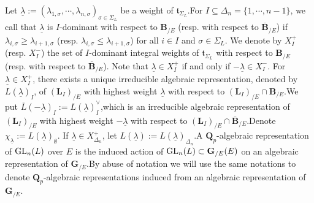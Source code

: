 \documentclass[SecEq,CM,GP]{degruyter-crelle} %
\theoremstyle{plain}
\newcommand{\GL}{{\rm GL}}
\newcommand{\ob}{{\overline{{\mathbf{B}}}}}
\newcommand{\ul}{\underline}
\newcommand{\bB}{{\mathbf{B}}}
\newcommand{\bL}{{\mathbf{L}}}
\newcommand{\bN}{{\mathbf{N}}}
\newcommand{\bQ}{{\mathbf{Q}}}
\newcommand{\ft}{{\mathfrak{t}}}
\begin{document}
Let $\ul{\lambda}:=(\lambda_{1,\sigma}, \cdots, \lambda_{n,\sigma})_{\sigma\in \Sigma_L}$ be a weight of $\ft_{\Sigma_L}$.\;For $I\subseteq \Delta_n=\{1,\cdots, n-1\}$, we call that $\ul{\lambda}$ is $I$-dominant with respect to $\bB_{/E}$ (resp. with respect to $\overline{\bB}_{/E}$) if $\lambda_{i,\sigma}\geq \lambda_{i+1,\sigma}$ \big(resp. $\lambda_{i,\sigma} \leq \lambda_{i+1,\sigma}$\big) for all $i\in I$ and $\sigma\in \Sigma_L$. We denote by $X_{I}^+$ (resp. $X_{I}^-$) the set of $I$-dominant integral weights  of $\ft_{\Sigma_L}$ with respect to $\bB_{/E}$ (resp. with respect to $\overline{\bB}_{/E}$). Note that $\ul{\lambda}\in X_{I}^+$ if and only if $-\ul{\lambda}\in X_{I}^-$. For $\ul{\lambda}\in X_I^+$, there exists a unique irreducible algebraic representation, denoted by $L(\ul{\lambda})_I$, of $(\bL_I)_{/E}$ with highest weight $\ul{\lambda}$ with respect to $(\bL_I)_{/E}\cap \bB_{/E}$.\;We put $\overline{L}(-\ul{\lambda})_I:=L(\ul{\lambda})^\vee_I$,\;which is an irreducible algebraic representation of $(\bL_I)_{/E}$ with highest weight $-\ul{\lambda}$ with respect to $(\bL_I)_{/E}\cap \ob_{/E}$.\;Denote $\chi_{\ul{\lambda}}:=L(\ul{\lambda})_{\emptyset}$. If $\ul{\lambda}\in X_{\Delta_n}^+$, let $L(\ul{\lambda}):=L(\ul{\lambda})_{\Delta_n}$.\;A $\bQ_p$-algebraic representation of $\GL_n(L)$ over $E$ is the induced action of $\GL_n(L)\subset \mathbf{G}_{/E}(E)$ on an algebraic representation of $\mathbf{G}_{/E}$.\;By abuse of notation we will use the same notations to denote $\bQ_p$-algebraic representations induced from an algebraic representation of $\mathbf{G}_{/E}$.\;

\end{document}
